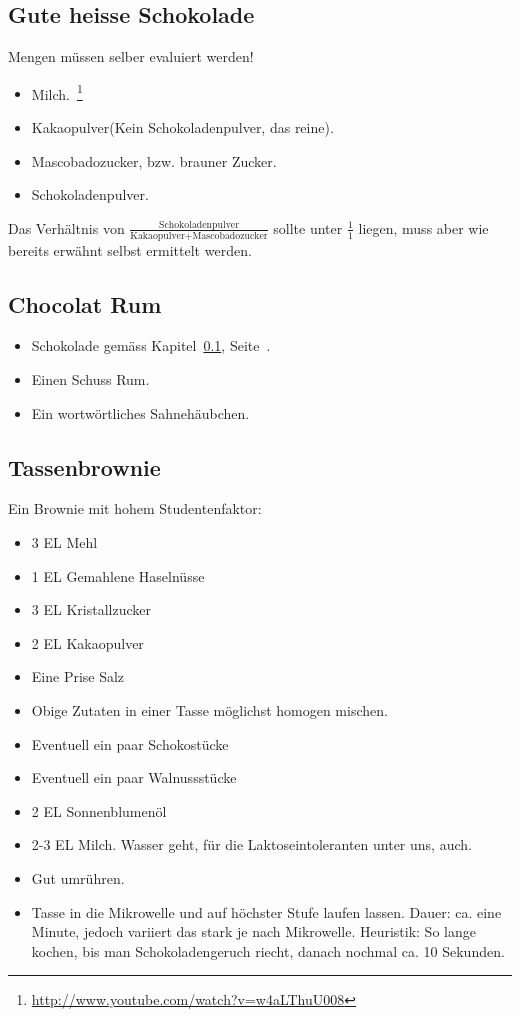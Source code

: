 \subsection{Gute heisse Schokolade}
\label{sec:hot_chocolate}
Mengen müssen selber evaluiert werden!
\begin{itemize}
	\item Milch.~\footnote{\url{http://www.youtube.com/watch?v=w4aLThuU008}}
	\item Kakaopulver(Kein Schokoladenpulver, das reine).
	\item Mascobadozucker, bzw. brauner Zucker.
	\item Schokoladenpulver.
\end{itemize}
Das Verhältnis von $\frac{\mbox{Schokoladenpulver}}{\mbox{Kakaopulver}+\mbox{Mascobadozucker}}$ sollte unter $\frac{1}{1}$ liegen, muss aber wie bereits erwähnt selbst ermittelt werden.
\subsection{Chocolat Rum}
\begin{itemize}
	\item Schokolade gemäss Kapitel~\ref{sec:hot_chocolate}, Seite~\pageref{sec:hot_chocolate}.
	\item Einen Schuss Rum.
	\item Ein wortwörtliches Sahnehäubchen.
\end{itemize}
\subsection{Tassenbrownie}
Ein Brownie mit hohem Studentenfaktor:
\begin{itemize}
	\item 3 EL Mehl
	\item 1 EL Gemahlene Haselnüsse
	\item 3 EL Kristallzucker
	\item 2 EL Kakaopulver
	\item Eine Prise Salz
	\item Obige Zutaten in einer Tasse möglichst homogen mischen.
	\item Eventuell ein paar Schokostücke
	\item Eventuell ein paar Walnussstücke
	\item 2 EL Sonnenblumenöl
	\item 2-3 EL Milch. Wasser geht, für die Laktoseintoleranten unter uns, auch.
	\item Gut umrühren.
	\item Tasse in die Mikrowelle und auf höchster Stufe laufen lassen.
	Dauer: ca. eine Minute, jedoch variiert das stark je nach Mikrowelle.
	Heuristik: So lange kochen, bis man Schokoladengeruch riecht, danach nochmal ca. 10 Sekunden.
\end{itemize}

